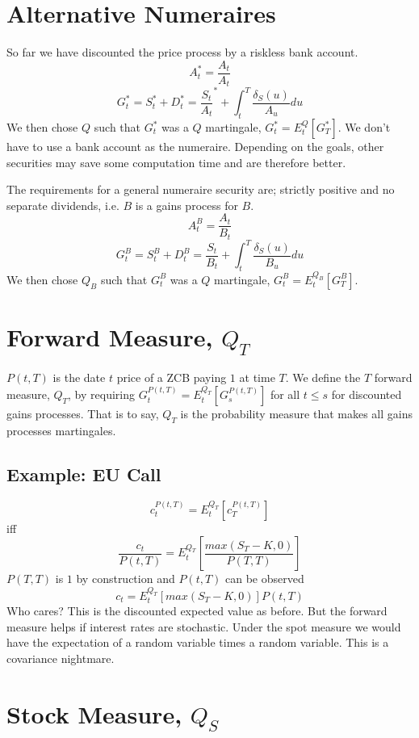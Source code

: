 
\section{Alternative Numeraires}

So far we have discounted the price process by a riskless bank account.
\[A_t^*=\frac{A_t}{A_t}\]
\[G_t^*=S_t^*+D_t^*=\frac{S_t}{A_t}^*+\int_t^T\frac{\delta_S(u)}{A_u}du\]
We then chose $Q$ such that $G_t^*$ was a $Q$ martingale, $G_t^*=E_t^Q[G_T^*]$.
We don't have to use a bank account as the numeraire.
Depending on the goals, other securities may save some computation time and are
therefore better.

The requirements for a general numeraire security are; strictly positive and no
separate dividends, i.e. $B$ is a gains process for $B$.
\[A_t^B=\frac{A_t}{B_t}\]
\[G_t^B=S_t^B+D_t^B=\frac{S_t}{B_t}+\int_t^T\frac{\delta_S(u)}{B_u}du\]
We then chose $Q_B$ such that $G_t^B$ was a $Q$ martingale,
$G_t^B=E_t^{Q_B}[G_T^B]$.

\section{Forward Measure, $Q_T$}

$P(t,T)$ is the date $t$ price of a ZCB paying $1$ at time $T$. We define the
$T$ forward measure, $Q_T$, by requiring
$G_t^{P(t,T)}=E_t^{Q_T}[G_s^{P(t,T)}]$ for all $t\leq s$ for discounted gains
processes. That is to say, $Q_T$ is the probability measure that makes all
gains processes martingales.

\subsection{Example: EU Call}

\[c_t^{P(t,T)}=E_t^{Q_T}[c_T^{P(t,T)}]\]
iff
\[\frac{c_t}{P(t,T)}=E_t^{Q_T}\left[\frac{max(S_T-K,0)}{P(T,T)}\right]\]
$P(T,T)$ is $1$ by construction and $P(t,T)$ can be observed
\[c_t=E_t^{Q_T}[max(S_T-K,0)]P(t,T)\]
Who cares? This is the discounted expected value as before. But the forward
measure helps if interest rates are stochastic. Under the spot measure we would
have the expectation of a random variable times a random variable. This is
a covariance nightmare.

\section{Stock Measure, $Q_S$}


